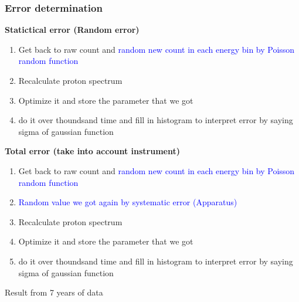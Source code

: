 \documentclass{beamer}
\begin{document}
\begin{frame}
  \frametitle{Error determination}
  \textbf{Statictical error (Random error)}
  \begin{enumerate}
    \item Get back to raw count and
    \textcolor{blue}{random new count in each energy bin by Poisson random function}
    \item Recalculate proton spectrum
    \item Optimize it and store the parameter that we got
    \item do it over thoundsand time and fill in histogram to interpret error by saying sigma of gaussian function
  \end{enumerate}
  \textbf{Total error (take into account instrument)}
  \begin{enumerate}
    \item Get back to raw count and
    \textcolor{blue}{random new count in each energy bin by Poisson random function}
    \item \textcolor{blue}{Random value we got again by systematic error (Apparatus)}
    \item Recalculate proton spectrum
    \item Optimize it and store the parameter that we got
    \item do it over thoundsand time and fill in histogram to interpret error by saying sigma of gaussian function
  \end{enumerate}
  \end{frame}

  \begin{frame}
    \Huge{\centerline{Result from 7 years of data}}
  \end{frame}    
\end{document}
